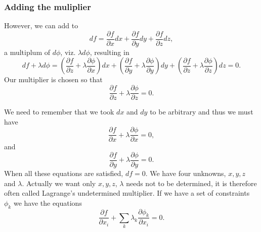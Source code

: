 \documentclass{beamer}
\begin{document}
\begin{frame}
\frametitle{Adding the muliplier}

However, we can add to
\[
df = \frac{\partial f}{\partial x}dx+\frac{\partial f}{\partial y}dy+\frac{\partial f}{\partial z}dz,
\]
a multiplum of $d\phi$, viz. $\lambda d\phi$, resulting  in
\[
df+\lambda d\phi = (\frac{\partial f}{\partial z}+\lambda
\frac{\partial \phi}{\partial x})dx+(\frac{\partial f}{\partial y}+\lambda\frac{\partial \phi}{\partial y})dy+
(\frac{\partial f}{\partial z}+\lambda\frac{\partial \phi}{\partial z})dz =0.
\]
Our multiplier is chosen so that
\[
\frac{\partial f}{\partial z}+\lambda\frac{\partial \phi}{\partial z} =0.
\]

We need to remember that we took $dx$ and $dy$ to be arbitrary and thus we must have
\[
\frac{\partial f}{\partial x}+\lambda\frac{\partial \phi}{\partial x} =0,
\]
and
\[
\frac{\partial f}{\partial y}+\lambda\frac{\partial \phi}{\partial y} =0.
\]
When all these equations are satisfied, $df=0$.  We have four unknowns, $x,y,z$ and
$\lambda$. Actually we want only $x,y,z$, $\lambda$ needs not to be determined, 
it is therefore often called
Lagrange's undetermined multiplier.
If we have a set of constraints $\phi_k$ we have the equations
\[
\frac{\partial f}{\partial x_i}+\sum_k\lambda_k\frac{\partial \phi_k}{\partial x_i} =0.
\]
\end{frame}
\end{document}
